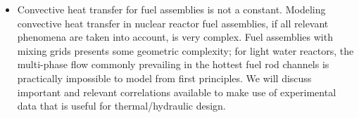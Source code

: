 \begin{itemize}
\item Convective heat transfer for fuel assemblies is not a constant.  Modeling convective heat transfer in nuclear reactor fuel assemblies, if all relevant phenomena are taken into account, is very complex.  Fuel assemblies with mixing grids presents some geometric complexity; for light water reactors, the multi-phase flow commonly prevailing in the hottest fuel rod channels is practically impossible to model from first principles.  We will discuss important and relevant correlations available to make use of experimental data that is useful for thermal/hydraulic design.
\end{itemize}

